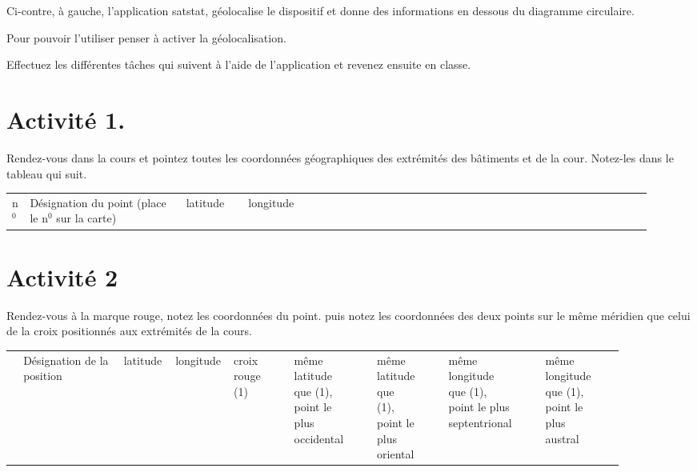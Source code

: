 \documentclass[12pt,a4paper,notitlepage,twoside]{article}
\renewcommand{\baselinestretch}{1.5}
\renewcommand{\baselinestretch}{1.25}
\begin{document}
\begin{multicols}{2}
\columnbreak

Ci-contre, à gauche, l'application satstat, géolocalise le dispositif et donne des informations en dessous du diagramme circulaire.

Pour pouvoir l'utiliser penser à activer la géolocalisation.

\vspace{2cm}

Effectuez les différentes tâches qui suivent à l'aide de l'application et revenez ensuite en classe.
\end{multicols}

\section{Activité 1.}
Rendez-vous dans la cours et pointez toutes les coordonnées géographiques des extrémités des bâtiments et de la cour. 
Notez-les dans le tableau qui suit. 
\begin{table}
	\centering
	\renewcommand*{\baselinestretch}{1.45}
	\begin{tabular}{| m{0.03\linewidth} | m{0.60\linewidth} | m{0.15\linewidth} | m{0.15\linewidth} |}
		\hline
		n$^0$ & Désignation du point (place le n$^0$ sur la carte) & latitude & longitude \cr
		 &  &  &  \cr
		 &  &  &  \cr
		 &  &  &  \cr
		 &  &  &  \cr
		 &  &  &  \cr
		 &  &  &  \cr
		 &  &  &  \cr
		 &  &  &  \cr
		 &  &  &  \cr
		 &  &  &  \cr
		\hline
	\end{tabular}
\end{table}

\section{Activité 2}
Rendez-vous à la marque rouge, notez les coordonnées du point. 
puis notez les coordonnées des deux points sur le même méridien que celui de la croix positionnés aux extrémités de la cours.
\begin{table}
	\centering
	\rowcolors{1}{white!95!black}{white}
	\begin{tabular}{| m{0.02\linewidth} | m{0.63\linewidth} | m{0.12\linewidth} | m{0.12\linewidth} |}
		\hline
		 & Désignation de la position & latitude & longitude \cr
		 & croix rouge (1) &  &  \cr
		 & même latitude que (1), point le plus occidental &  &  \cr
		 & même latitude que (1), point le plus oriental &  &  \cr
		 & même longitude que (1), point le plus septentrional &  &  \cr
		 & même longitude que (1), point le plus austral &  &  \cr
		\hline
	\end{tabular}
\end{table}
\end{document}
